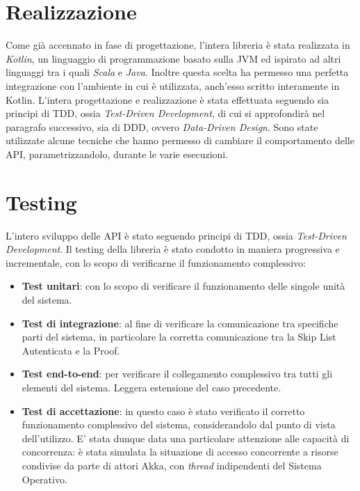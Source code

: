 \section{Realizzazione}

	
	Come già accennato in fase di progettazione, l'intera libreria è stata realizzata in \textit{Kotlin}, un linguaggio di programmazione basato sulla JVM ed ispirato ad altri linguaggi tra i quali \textit{Scala} e \textit{Java}. Inoltre questa scelta ha permesso una perfetta integrazione con l'ambiente in cui è utilizzata, anch'esso scritto interamente in Kotlin.
	L'intera progettazione e realizzazione è stata effettuata seguendo sia principi di TDD, ossia \textit{Test-Driven Development}, di cui si approfondirà nel paragrafo successivo, sia di DDD, ovvero \textit{Data-Driven Design}. Sono state utilizzate alcune tecniche che hanno permesso di cambiare il comportamento delle API, parametrizzandolo, durante le varie esecuzioni.

\section{Testing}


	L'intero sviluppo delle API è stato seguendo principi di TDD, ossia \textit{Test-Driven Development}. Il testing della libreria è stato condotto in maniera progressiva e incrementale, con lo scopo di verificarne il funzionamento complessivo:
	
	\begin{itemize}
		\item \textbf{Test unitari}: con lo scopo di verificare il funzionamento delle singole unità del sistema.
		\item \textbf{Test di integrazione}: al fine di verificare la comunicazione tra specifiche parti del sistema, in particolare la corretta comunicazione tra la Skip List Autenticata e la Proof.
		\item \textbf{Test end-to-end}: per verificare il collegamento complessivo tra tutti gli elementi del sistema. Leggera estensione del caso precedente.
		\item \textbf{Test di accettazione}: in questo caso è stato verificato il corretto funzionamento complessivo del sistema, considerandolo dal punto di vista dell'utilizzo. E' stata dunque data una particolare attenzione alle capacità di concorrenza: è stata simulata la situazione di accesso concorrente a risorse condivise da parte di attori Akka, con \textit{thread} indipendenti del Sistema Operativo.
	\end{itemize}

